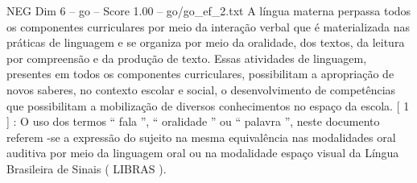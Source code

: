 \begin{textsample}{NEG Dim 6 – go – Score 1.00 – go/go\_ef\_2.txt}
A língua materna perpassa todos os componentes curriculares por meio da interação verbal que é materializada nas práticas de linguagem e se organiza por meio da oralidade, dos textos, da leitura por compreensão e da produção de texto.
Essas atividades de linguagem, presentes em todos os componentes curriculares, possibilitam a apropriação de novos saberes, no contexto escolar e social, o desenvolvimento de competências que possibilitam a mobilização de diversos conhecimentos no espaço da escola. [ 1 ] : O uso dos termos “ fala ”, “ oralidade ” ou “ palavra ”, neste documento referem -se a expressão do sujeito na mesma equivalência nas modalidades oral auditiva por meio da linguagem oral ou na modalidade espaço visual da Língua Brasileira de Sinais ( LIBRAS ).

\end{textsample}
